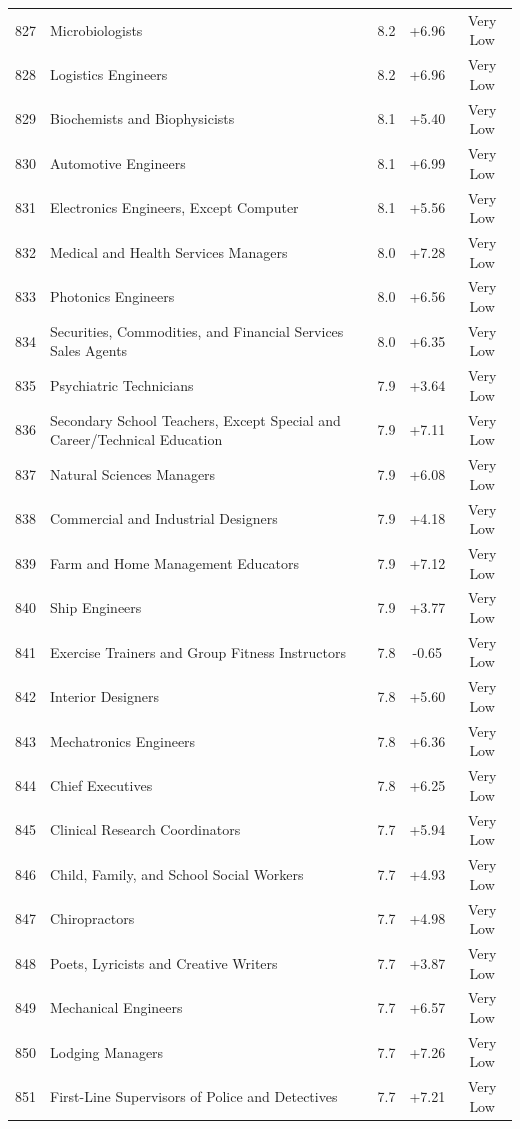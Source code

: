 {\begin{longtable}{rp{7cm}ccc}
827 & Microbiologists & 8.2 & +6.96 & Very Low \\
828 & Logistics Engineers & 8.2 & +6.96 & Very Low \\
829 & Biochemists and Biophysicists & 8.1 & +5.40 & Very Low \\
830 & Automotive Engineers & 8.1 & +6.99 & Very Low \\
831 & Electronics Engineers, Except Computer & 8.1 & +5.56 & Very Low \\
832 & Medical and Health Services Managers & 8.0 & +7.28 & Very Low \\
833 & Photonics Engineers & 8.0 & +6.56 & Very Low \\
834 & Securities, Commodities, and Financial Services Sales Agents & 8.0 & +6.35 & Very Low \\
835 & Psychiatric Technicians & 7.9 & +3.64 & Very Low \\
836 & Secondary School Teachers, Except Special and Career/Technical Education & 7.9 & +7.11 & Very Low \\
837 & Natural Sciences Managers & 7.9 & +6.08 & Very Low \\
838 & Commercial and Industrial Designers & 7.9 & +4.18 & Very Low \\
839 & Farm and Home Management Educators & 7.9 & +7.12 & Very Low \\
840 & Ship Engineers & 7.9 & +3.77 & Very Low \\
841 & Exercise Trainers and Group Fitness Instructors & 7.8 & -0.65 & Very Low \\
842 & Interior Designers & 7.8 & +5.60 & Very Low \\
843 & Mechatronics Engineers & 7.8 & +6.36 & Very Low \\
844 & Chief Executives & 7.8 & +6.25 & Very Low \\
845 & Clinical Research Coordinators & 7.7 & +5.94 & Very Low \\
846 & Child, Family, and School Social Workers & 7.7 & +4.93 & Very Low \\
847 & Chiropractors & 7.7 & +4.98 & Very Low \\
848 & Poets, Lyricists and Creative Writers & 7.7 & +3.87 & Very Low \\
849 & Mechanical Engineers & 7.7 & +6.57 & Very Low \\
850 & Lodging Managers & 7.7 & +7.26 & Very Low \\
851 & First-Line Supervisors of Police and Detectives & 7.7 & +7.21 & Very Low \\

\end{longtable}}
